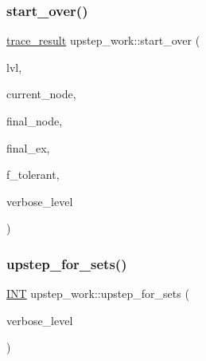 \subsubsection{\texorpdfstring{start\+\_\+over()}{start\_over()}}
{\footnotesize\ttfamily \mbox{\hyperlink{snakesandladders_8h_ac88defea077c05403847ed918e76bdde}{trace\+\_\+result}} upstep\+\_\+work\+::start\+\_\+over (\begin{DoxyParamCaption}\item[{\mbox{\hyperlink{galois_8h_a09fddde158a3a20bd2dcadb609de11dc}{I\+NT}}}]{lvl,  }\item[{\mbox{\hyperlink{galois_8h_a09fddde158a3a20bd2dcadb609de11dc}{I\+NT}}}]{current\+\_\+node,  }\item[{\mbox{\hyperlink{galois_8h_a09fddde158a3a20bd2dcadb609de11dc}{I\+NT}} \&}]{final\+\_\+node,  }\item[{\mbox{\hyperlink{galois_8h_a09fddde158a3a20bd2dcadb609de11dc}{I\+NT}} \&}]{final\+\_\+ex,  }\item[{\mbox{\hyperlink{galois_8h_a09fddde158a3a20bd2dcadb609de11dc}{I\+NT}}}]{f\+\_\+tolerant,  }\item[{\mbox{\hyperlink{galois_8h_a09fddde158a3a20bd2dcadb609de11dc}{I\+NT}}}]{verbose\+\_\+level }\end{DoxyParamCaption})}

\mbox{\label{classupstep__work_acbfe3d5e23c38c3dc8f5908e0bc5bf1b}} 
\subsubsection{\texorpdfstring{upstep\+\_\+for\+\_\+sets()}{upstep\_for\_sets()}}
{\footnotesize\ttfamily \mbox{\hyperlink{galois_8h_a09fddde158a3a20bd2dcadb609de11dc}{I\+NT}} upstep\+\_\+work\+::upstep\+\_\+for\+\_\+sets (\begin{DoxyParamCaption}\item[{\mbox{\hyperlink{galois_8h_a09fddde158a3a20bd2dcadb609de11dc}{I\+NT}}}]{verbose\+\_\+level }\end{DoxyParamCaption})}

\mbox{\label{classupstep__work_afd45c862c93f460a2e523f074d024529}} 
